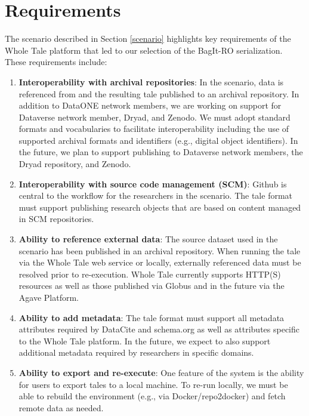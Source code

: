 \documentclass[conference]{IEEEtran}
\begin{document}
\section{Requirements}  \label{requirements}
The scenario described in Section \ref{scenario} highlights key requirements of the 
Whole Tale platform that led to our selection of the BagIt-RO serialization.  These requirements include:

\begin{enumerate}
\item{{\bf Interoperability with archival repositories}: In the
    scenario, data is referenced from and the resulting tale published
    to an archival repository. In addition to DataONE network members,
    we are working on support for Dataverse network member, Dryad, and
    Zenodo. We must adopt standard formats and vocabularies to
    facilitate interoperability including the use of supported
    archival formats and identifiers (e.g., digital object
    identifiers).  
In the future, we plan to support publishing to
    Dataverse network members, the Dryad repository, and Zenodo.} 
\item{{\bf Interoperability with source code management (SCM)}:  Github is central to the workflow for the researchers in the scenario. The tale format must support publishing research objects that are based on content managed in SCM repositories.}
\item{{\bf Ability to reference external data}: The source dataset used in the scenario has been published in an archival repository. When running the tale via the Whole Tale web service or locally, externally referenced data must be resolved prior to re-execution. Whole Tale currently supports HTTP(S) resources as well as those published via Globus and in the future via the Agave Platform.}
\item{{\bf Ability to add metadata}: The tale format must support all
    metadata attributes required by DataCite and schema.org as well as
    attributes specific to the Whole Tale platform. 
 In the future, we expect to also support additional metadata required by researchers in specific domains.}
\item{{\bf Ability to export and re-execute}: One feature of the system is the ability for users to export tales to a local machine. To re-run locally, we must be able to rebuild the environment (e.g., via Docker/repo2docker) and fetch remote data as needed.}

\end{enumerate}
\end{document}

